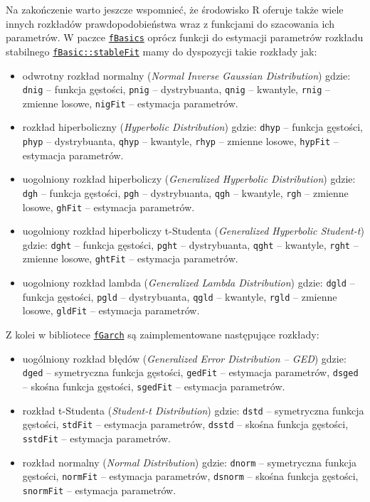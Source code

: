 \documentclass[polish,]{book}
\begin{document}
Na zakończenie warto jeszcze wspomnieć, że środowisko R oferuje także wiele innych rozkładów prawdopodobieństwa wraz z funkcjami do szacowania
ich parametrów. W paczce \href{https://rdrr.io/cran/fBasics/}{\texttt{fBasics}} oprócz funkcji do estymacji parametrów rozkładu stabilnego \href{https://rdrr.io/cran/fBasics/man/dist-DistributionFits.html}{\texttt{fBasic::stableFit}} mamy do dyspozycji takie rozkłady jak:

\begin{itemize}
\item
  odwrotny rozkład normalny (\emph{Normal Inverse Gaussian Distribution})
  gdzie:
  \texttt{dnig} -- funkcja gęstości, \texttt{pnig} -- dystrybuanta, \texttt{qnig} -- kwantyle, \texttt{rnig} -- zmienne
  losowe, \texttt{nigFit} -- estymacja parametrów.
\item
  rozkład hiperboliczny (\emph{Hyperbolic Distribution})
  gdzie:
  \texttt{dhyp} -- funkcja gęstości, \texttt{phyp} -- dystrybuanta, \texttt{qhyp} -- kwantyle, \texttt{rhyp} -- zmienne
  losowe, \texttt{hypFit} -- estymacja parametrów.
\item
  uogolniony rozkład hiperboliczy (\emph{Generalized Hyperbolic Distribution})
  gdzie:
  \texttt{dgh} -- funkcja gęstości, \texttt{pgh} -- dystrybuanta, \texttt{qgh} -- kwantyle, \texttt{rgh} -- zmienne
  losowe, \texttt{ghFit} -- estymacja parametrów.
\item
  uogolniony rozkład hiperboliczy t-Studenta (\emph{Generalized Hyperbolic Student-t})
  gdzie:
  \texttt{dght} -- funkcja gęstości, \texttt{pght} -- dystrybuanta, \texttt{qght} -- kwantyle, \texttt{rght} -- zmienne
  losowe, \texttt{ghtFit} -- estymacja parametrów.
\item
  uogolniony rozkład lambda (\emph{Generalized Lambda Distribution})
  gdzie:
  \texttt{dgld} -- funkcja gęstości, \texttt{pgld} -- dystrybuanta, \texttt{qgld} -- kwantyle, \texttt{rgld} -- zmienne
  losowe, \texttt{gldFit} -- estymacja parametrów.
\end{itemize}

Z kolei w bibliotece \href{https://rdrr.io/cran/fGarch/}{\texttt{fGarch}} są zaimplementowane następujące rozkłady:

\begin{itemize}
\item
  uogólniony rozkład błędów (\emph{Generalized Error Distribution -- GED})
  gdzie:
  \texttt{dged} -- symetryczna funkcja gęstości, \texttt{gedFit} -- estymacja parametrów,
  \texttt{dsged} -- skośna funkcja gęstości, \texttt{sgedFit} -- estymacja parametrów.
\item
  rozkład t-Studenta (\emph{Student-t Distribution})
  gdzie:
  \texttt{dstd} -- symetryczna funkcja gęstości, \texttt{stdFit} -- estymacja parametrów,
  \texttt{dsstd} -- skośna funkcja gęstości, \texttt{sstdFit} -- estymacja parametrów.
\item
  rozkład normalny (\emph{Normal Distribution})
  gdzie:
  \texttt{dnorm} -- symetryczna funkcja gęstości, \texttt{normFit} -- estymacja parametrów,
  \texttt{dsnorm} -- skośna funkcja gęstości, \texttt{snormFit} -- estymacja parametrów.
\end{itemize}
\end{document}
